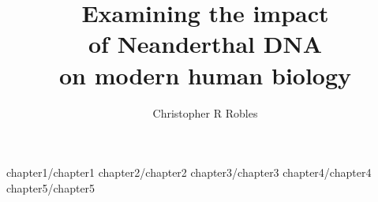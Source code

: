 \documentclass [PhD] {uclathes}
\title          {Examining the impact \\
                of Neanderthal DNA \\
                on modern human biology}
\author         {Christopher R Robles}
\begin{document}
\makeintropages

%
%
 {chapter1/chapter1}                         %
 {chapter2/chapter2}                         %
 {chapter3/chapter3}                         %
 {chapter4/chapter4}
 {chapter5/chapter5}



\end{document}
